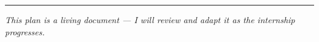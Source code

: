 \documentclass[12pt,a4paper]{article}
\begin{document}
\vspace{1cm}
\noindent\color{midblue}\rule{\linewidth}{1pt}\color{black}
\begin{center}
  \small\itshape\color{greytext}
  This plan is a living document --- I will review and adapt it as the internship progresses.
\end{center}
\end{document}
